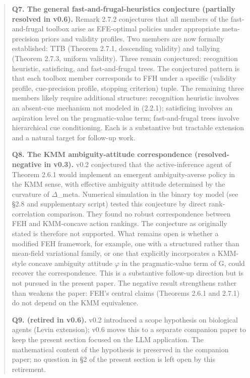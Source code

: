 \documentclass{article}
\begin{document}
\begin{quote}
\textbf{Q7. The general fast-and-frugal-heuristics conjecture (partially
resolved in v0.6).} Remark 2.7.2 conjectures that all members of the
fast-and-frugal toolbox arise as EFE-optimal policies under appropriate
meta-precision priors and validity profiles. Two members are now
formally established: TTB (Theorem 2.7.1, descending validity) and
tallying (Theorem 2.7.3, uniform validity). Three remain conjectured:
recognition heuristic, satisficing, and fast-and-frugal trees. The
conjectured pattern is that each toolbox member corresponds to FFH under
a specific (validity profile, cue-precision profile, stopping criterion)
tuple. The remaining three members likely require additional structure:
recognition heuristic involves an absent-cue mechanism not modeled in
(2.2.1); satisficing involves an aspiration level on the pragmatic-value
term; fast-and-frugal trees involve hierarchical cue conditioning. Each
is a substantive but tractable extension and a natural target for
follow-up work.

\textbf{Q8. The KMM ambiguity-attitude correspondence (resolved-negative
in v0.3).} v0.2 conjectured that the active-inference agent of Theorem
2.6.1 would implement an emergent ambiguity-averse policy in the KMM
sense, with effective ambiguity attitude determined by the curvature of
\ensuremath{\Delta}\_meta. Numerical simulation in the binary toy model (see \S{}2.8 and
supplementary script) tested this conjecture by direct rank-correlation
comparison. They found no robust correspondence between FEH and
KMM-concave action rankings. The conjecture as originally stated is
therefore not supported. What remains open is whether a modified FEH
framework, for example, one with a structured rather than mean-field
variational family, or one that explicitly incorporates a KMM-style
concave ambiguity attitude \ensuremath{\varphi} in the pragmatic-value term of G, could
recover the correspondence. This is a substantive follow-up direction
but is not pursued in the present paper. The negative result strengthens
rather than weakens the paper: FEH's central claims (Theorems 2.6.1 and
2.7.1) do not depend on the KMM equivalence.

\textbf{Q9. (retired in v0.6).} v0.2 introduced a scope hypothesis on
biological agents (Levin extension); v0.6 moves this to a separate
companion paper to keep the present section focused on the LLM
application. The mathematical content of the hypothesis is preserved in
the companion paper; no question in \S{}2 of the present section is left
open by this retirement.
\end{quote}
\end{document}
